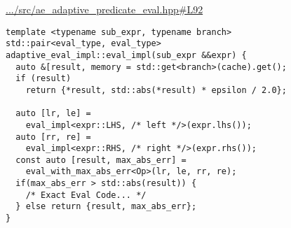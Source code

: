 \href{https://github.com/mfdeakin/adaptive_predicates/blob/main/src/ae_adaptive_predicate_eval.hpp#L92}{.../src/ae\_adaptive\_predicate\_eval.hpp\#L92}
\begin{lstlisting}[basicstyle=\small\ttfamily]
template <typename sub_expr, typename branch>
std::pair<eval_type, eval_type>
adaptive_eval_impl::eval_impl(sub_expr &&expr) {
  auto &[result, memory = std::get<branch>(cache).get();
  if (result)
    return {*result, std::abs(*result) * epsilon / 2.0};

  auto [lr, le] =
    eval_impl<expr::LHS, /* left */>(expr.lhs());
  auto [rr, re] =
    eval_impl<expr::RHS, /* right */>(expr.rhs());
  const auto [result, max_abs_err] =
    eval_with_max_abs_err<Op>(lr, le, rr, re);
  if(max_abs_err > std::abs(result)) {
    /* Exact Eval Code... */
  } else return {result, max_abs_err};
}
\end{lstlisting}
